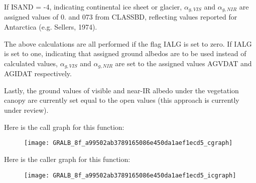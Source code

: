 If I\+S\+A\+N\+D = -\/4, indicating continental ice sheet or glacier, $\alpha_{g,VIS}$ and $\alpha_{g,NIR}$ are assigned values of 0. and 073 from C\+L\+A\+S\+S\+B\+D, reflecting values reported for Antarctica (e.\+g. Sellers, 1974).

The above calculations are all performed if the flag I\+A\+L\+G is set to zero. If I\+A\+L\+G is set to one, indicating that assigned ground albedos are to be used instead of calculated values, $\alpha_{g,VIS}$ and $\alpha_{g,NIR}$ are set to the assigned values A\+G\+V\+D\+A\+T and A\+G\+I\+D\+A\+T respectively.

Lastly, the ground values of visible and near-\/\+I\+R albedo under the vegetation canopy are currently set equal to the open values (this approach is currently under review).

Here is the call graph for this function\+:\nopagebreak
\begin{figure}[H]
\begin{center}
\leavevmode
\texttt{[image: GRALB\_8f\_a99502ab3789165086e450da1aef1ecd5\_cgraph]}
\end{center}
\end{figure}




Here is the caller graph for this function\+:\nopagebreak
\begin{figure}[H]
\begin{center}
\leavevmode
\texttt{[image: GRALB\_8f\_a99502ab3789165086e450da1aef1ecd5\_icgraph]}
\end{center}
\end{figure}



